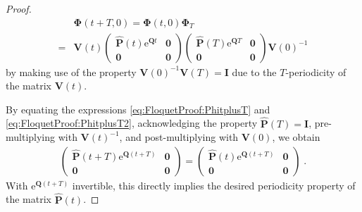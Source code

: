 \documentclass[10pt,a4paper]{amsart}
\newcommand{\ex}{\re} %
\newcommand{\mo}{\vPh_T}
\newcommand{\re}{\mathrm e}
\newcommand{\vI}{\mathbf I}
\newcommand{\vP}{\mathbf P}
\newcommand{\vPh}{\mathbf \Phi}
\newcommand{\vQ}{\mathbf Q}
\newcommand{\vV}{\mathbf V}
\newcommand{\vzero}{\mathbf{0}}
\begin{document}
\begin{proof}
    \begin{align}\label{eq:FloquetProof:PhitplusT2}
        &\vPh(t + T, 0) =  \vPh(t, 0) \mo \nonumber\\
        =& \vV(t) \begin{pmatrix}
            \hat{\vP}(t) \ex^{\vQ t} & \vzero\\ \vzero & \vzero
        \end{pmatrix} \begin{pmatrix}
            \hat{\vP}(T)\ex^{\vQ T} & \vzero\\ \vzero & \vzero
        \end{pmatrix} \vV(0)^{-1}
    \end{align}
    by making use of the property $\vV(0)^{-1}\vV(T) =\vI$ due to the $T$-periodicity of the matrix $\vV(t)$.
    
    By equating the expressions \eqref{eq:FloquetProof:PhitplusT} and \eqref{eq:FloquetProof:PhitplusT2}, acknowledging the property $\hat{\vP}(T)=\vI$, pre-multiplying with $\vV(t)^{-1}$, and post-multiplying with $\vV(0)$, we obtain
\begin{align}
        \begin{pmatrix}
            \hat{\vP}(t + T) \ex^{\vQ (t+T)} & \vzero\\ \vzero & \vzero
        \end{pmatrix} = \begin{pmatrix}
            \hat{\vP}(t) \ex^{\vQ (t+T)} & \vzero\\ \vzero & \vzero
        \end{pmatrix} \;.
    \end{align}
    With $\ex^{\vQ (t+T)}$ invertible, this directly implies the desired periodicity property of the matrix $\hat{\vP}(t)$.
\end{proof}
\end{document}
